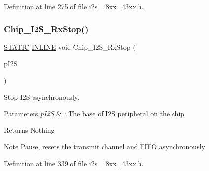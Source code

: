 Definition at line 275 of file i2s\+\_\+18xx\+\_\+43xx.\+h.

\mbox{\label{group___i2_s__18_x_x__43_x_x_gaa78f387af78de456819cec21bbf21ada}} 
\subsubsection{\texorpdfstring{Chip\+\_\+\+I2\+S\+\_\+\+Rx\+Stop()}{Chip\_I2S\_RxStop()}}
{\footnotesize\ttfamily \hyperlink{group___l_p_c___types___public___macros_ga10b2d890d871e1489bb02b7e70d9bdfb}{S\+T\+A\+T\+IC} \hyperlink{spifi__18xx__43xx_8h_a2eb6f9e0395b47b8d5e3eeae4fe0c116}{I\+N\+L\+I\+NE} void Chip\+\_\+\+I2\+S\+\_\+\+Rx\+Stop (\begin{DoxyParamCaption}\item[{\hyperlink{struct_l_p_c___i2_s___t}{L\+P\+C\+\_\+\+I2\+S\+\_\+T} $\ast$}]{p\+I2S }\end{DoxyParamCaption})}



Stop I2S asynchronously. 


\begin{DoxyParams}{Parameters}
{\em p\+I2S} & \+: The base of I2S peripheral on the chip \\
\hline
\end{DoxyParams}
\begin{DoxyReturn}{Returns}
Nothing 
\end{DoxyReturn}
\begin{DoxyNote}{Note}
Pause, resets the transmit channel and F\+I\+FO asynchronously 
\end{DoxyNote}


Definition at line 339 of file i2s\+\_\+18xx\+\_\+43xx.\+h.

\mbox{\label{group___i2_s__18_x_x__43_x_x_ga7927122545d8ec1879743fb8caffb723}} 
